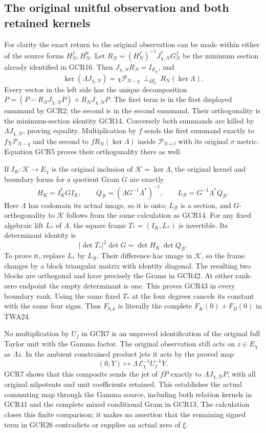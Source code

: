 \subsection{The original unitful observation and both retained kernels}

For clarity the exact return to the original observation can be
made within either of the source forms $H_N^f,H_N^0$.
Let $R_N=(H_N^f)^{-1}J_{\chi,N}^*G_N^f$ be the minimum
section already identified in GCR16. Then
$J_{\chi,N}R_N=I_{E_\chi}$, and
\[
 \ker(\Lambda J_{\chi,N})
       =\chi\mathcal P_{N-q}\ \mathbin{\perp_{H_N^f}}\
                                  R_N(\ker\Lambda).
\tag{GCR41}
\]
Every vector in the left side has the unique decomposition
$P=(P-R_NJ_{\chi,N}P)+R_NJ_{\chi,N}P$.
The first term is in the first displayed summand by GCR2;
the second is in the second summand. Their orthogonality is
the minimum-section identity GCR14. Conversely both summands
are killed by $\Lambda J_{\chi,N}$, proving equality.
Multiplication by $f$ sends the first summand exactly to
$f\chi\mathcal P_{N-q}$ and the second to $fR_N(\ker\Lambda)$
inside $\mathcal P_{N+l}$ with its original $\sigma$ metric.
Equation GCR5 proves their orthogonality there as well.

If $I_K:\mathcal K\to E_\chi$ is the original inclusion
of $\mathcal K=\ker\Lambda$, the original kernel and boundary
forms for a quotient Gram $G$ are exactly
\[
 H_K=I_K^*GI_K,\qquad
 Q_{\mathcal B}=(\Lambda G^{-1}\Lambda^*)^{-1},\qquad
 L_{\mathcal B}=G^{-1}\Lambda^*Q_{\mathcal B}.
\tag{GCR42}
\]
Here $\Lambda$ has codomain its actual image, so it is onto;
$L_{\mathcal B}$ is a section, and $G$-orthogonality to
$\mathcal K$ follows from the same calculation as GCR14.
For any fixed algebraic lift $L_*$ of $\Lambda$, the square
frame $T_*=(I_K,L_*)$ is invertible. Its determinant identity is
\[
 |\det T_*|^2\det G
       =\det H_K\,\det Q_{\mathcal B}.
\tag{GCR43}
\]
To prove it, replace $L_*$ by $L_{\mathcal B}$.
Their difference has image in $\mathcal K$, so the frame
changes by a block triangular matrix with identity diagonal.
The resulting two blocks are orthogonal and have precisely
the Grams in GCR42. At either rank-zero endpoint the empty
determinant is one. This proves GCR43 in every boundary rank.
Using the same fixed $T_*$ at the four degrees cancels its
constant with the same four signs. Thus $F_{0,k}$ is literally
the complete $F_K(0)+F_B(0)$ in TWA24.

No multiplication by $U_f$ in GCR7 is an unproved identification
of the original full Taylor unit with the Gamma factor.
The original observation still acts on $z\in E_\chi$ as
$\Lambda z$. In the ambient constrained product jets it acts
by the proved map
\[
 (0,Y)\longmapsto
       \Lambda\,\mathcal E_\chi^{-1}U_f^{-1}Y.
\tag{GCR44}
\]
GCR7 shows that this composite sends the jet of $fP$ exactly
to $\Lambda J_{\chi,N}P$, with all original nilpotents and
unit coefficients retained. This establishes the actual
commuting map through the Gamma source, including both
relation kernels in GCR41 and the complete mixed conditional
Gram in GCR13. The calculation closes this finite comparison;
it makes no assertion that the remaining signed term in
GCR26 contradicts or supplies an actual zero of $\xi$.
